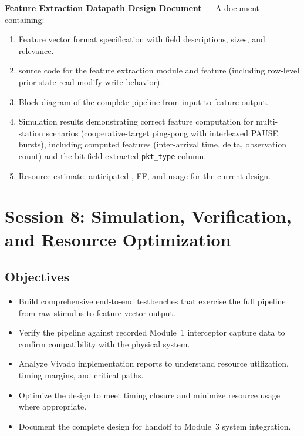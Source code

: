 \documentclass[11pt,letterpaper]{article}
\begin{document}
	\begin{tcolorbox}[deliverable={Session 7 Deliverable}]
		\textbf{Feature Extraction Datapath Design Document} --- A document containing:
		\begin{enumerate}
			\item Feature vector format specification with field descriptions, sizes, and \ML{} relevance.
			\item \VHDL{} source code for the feature extraction module and feature \BRAM{} (including row-level prior-state read-modify-write behavior).
			\item Block diagram of the complete pipeline from \UART{} input to feature \BRAM{} output.
			\item Simulation results demonstrating correct feature computation for multi-station scenarios (cooperative-target ping-pong with interleaved PAUSE bursts), including computed features (inter-arrival time, \RSSI{} delta, observation count) and the bit-field-extracted \texttt{pkt\_type} column.
			\item Resource estimate: anticipated \LUT{}, FF, and \BRAM{} usage for the current design.
		\end{enumerate}
	\end{tcolorbox}

	\newpage
	\section{Session 8: Simulation, Verification, and Resource Optimization}
	\label{sec:verification}

	\subsection{Objectives}

	\begin{itemize}[leftmargin=2em]
		\item Build comprehensive end-to-end testbenches that exercise the full pipeline from raw \UART{} stimulus to feature vector output.
		\item Verify the pipeline against recorded Module~1 interceptor capture data to confirm compatibility with the physical system.
		\item Analyze Vivado implementation reports to understand resource utilization, timing margins, and critical paths.
		\item Optimize the design to meet timing closure and minimize resource usage where appropriate.
		\item Document the complete \RTL{} design for handoff to Module~3 system integration.
	\end{itemize}
\end{document}
